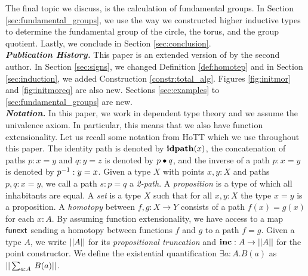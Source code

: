 The final topic we discuss, is the calculation of fundamental groups.
In Section \ref{sec:fundamental_groups}, we use the way we constructed higher inductive types to determine the fundamental group of the circle, the torus, and the group quotient.
Lastly, we conclude in Section \ref{sec:conclusion}.
\\
\emph{\textbf{Publication History.}}
This paper is an extended version of \cite{nmvdw2020} by the second author.
In Section \ref{sec:signs}, we changed Definition \ref{def:homotep} and in Section \ref{sec:induction}, we added Construction \ref{constr:total_alg}.
Figures \ref{fig:initmor} and \ref{fig:initmoreq} are also new.
Sections \ref{sec:examples} to \ref{sec:fundamental_groups} are new.
\\
\emph{\textbf{Notation.}}
In this paper, we work in dependent type theory and we assume the univalence axiom. In particular, this means that we also have function extensionality.
Let us recall some notation from HoTT which we use throughout this paper.
The identity path is denoted by $\operatorname{\mathbf{idpath}}(x)$, the concatenation of paths $p : x = y$ and $q : y = z$ is denoted by $p \bullet q$, and the inverse of a path $p : x = y$ is denoted by $p^{-1} : y = x$.
Given a type $X$ with points $x, y : X$ and paths $p, q : x = y$, we call a path $s : p = q$ a \emph{2-path}.
A \emph{proposition} is a type of which all inhabitants are equal.
A \emph{set} is a type $X$ such that for all $x, y : X$ the type $x = y$ is a proposition.
A \emph{homotopy} between $f, g : X \rightarrow Y$ consists of a path
$f(x) = g(x)$ for each $x : A$. By assuming function
extensionality, we have access to a map $\mathsf{funext}$ sending a
homotopy between functions $f$ and $g$ to a path $f = g$. Given a
type $A$, we write $|| A ||$ for its \emph{propositional truncation}
and $\operatorname{\mathbf{inc}} : A \to || A ||$ for the point constructor. We define the existential quantification
$\exists a : A.B(a)$ as $\PT{\Sum {a : A}. B(a)}$.
